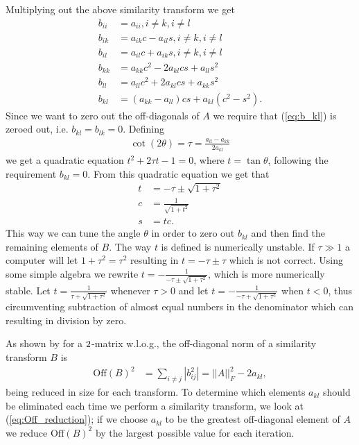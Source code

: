 \documentclass[twocolumn]{aastex62}
\begin{document}
Multiplying out the above similarity transform we get 
\begin{align}
	b_{ii} &= a_{ii} , i\neq k, i\neq l\\
	b_{ik} &= a_{ik}c - a_{il}s, i\neq k, i\neq l\\
	b_{il} &= a_{il}c + a_{ik}s, i\neq k, i\neq l\\
	b_{kk} &= a_{kk}c^2 - 2a_{kl}cs + a_{ll}s^2\\
	b_{ll} &= a_{ll}c^2 + 2a_{kl}cs + a_{kk}s^2\\
	b_{kl} &= (a_{kk} - a_{ll})cs + a_{kl}(c^2 - s^2).
	\label{eq:b_kl}
\end{align}
Since we want to zero out the off-diagonals of $A$ we require that (\ref{eq:b_kl}) is zeroed out, i.e. $b_{kl} = b_{lk} = 0$. Defining 
\begin{align}
	\cot(2\theta) = \tau = \frac{a_{ll} - a_{kk}}{2a_{kl}}
\end{align}
we get a quadratic equation $t^2 + 2\tau t - 1 = 0$, where $t = \tan \theta$, following the requirement $b_{kl} = 0$. From this quadratic equation we get that 
\begin{align}
	t &= -\tau \pm \sqrt{1+\tau^2}\\
	c & = \frac{1}{\sqrt{1+t^2}}\\
	s &= tc.
\end{align}
This way we can tune the angle $\theta$ in order to zero out $b_{kl}$ and then find the remaining elements of $B$.  The way $t$ is defined is numerically unstable. If $\tau\gg1$ a computer will let $1+\tau^2 = \tau^2$ resulting in $t = -\tau \pm \tau$ which is not correct. Using some simple algebra we rewrite $t = -\frac{1}{-\tau \pm \sqrt{1 + \tau^2}}$, which is more numerically stable. Let $t = \frac{1}{\tau + \sqrt{1 + \tau^2}}$ whenever $\tau>0$ and let $t = -\frac{1}{-\tau + \sqrt{1+\tau^2}}$ when $t<0$, thus circumventing  subtraction of almost equal numbers in the denominator which can resulting in division by zero.

As shown by \citep[Ch. 7.4]{Jensen:2015} for a $2\time 2$-matrix w.l.o.g., the off-diagonal norm of a similarity transform $B$ is 
\begin{align}
\text{Off}(B)^2&= \sum_{i\neq j} |b_{ij}^2| = ||A||_F^2 - 2a_{kl},
\label{eq:Off_reduction}
\end{align}
being reduced in size for each transform. To determine which elements $a_{kl}$ should be eliminated each time we perform a similarity transform, we look at (\ref{eq:Off_reduction}); if we choose $a_{kl}$ to be the greatest off-diagonal element of $A$ we reduce $\text{Off}(B)^2$ by the largest possible value for each iteration. 
\end{document}

